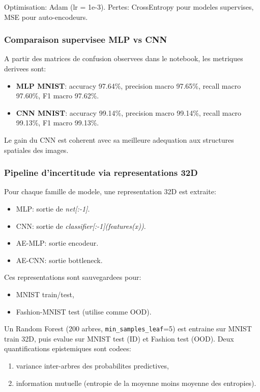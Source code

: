 \documentclass[11pt,a4paper]{article}
\begin{document}
Optimisation: Adam (lr = 1e-3). Pertes: CrossEntropy pour modeles supervises, MSE pour auto-encodeurs.

\subsubsection{Comparaison supervisee MLP vs CNN}
A partir des matrices de confusion observees dans le notebook, les metriques derivees sont:
\begin{itemize}[leftmargin=1.2cm]
    \item \textbf{MLP MNIST}: accuracy 97.64\%, precision macro 97.65\%, recall macro 97.60\%, F1 macro 97.62\%.
    \item \textbf{CNN MNIST}: accuracy 99.14\%, precision macro 99.14\%, recall macro 99.13\%, F1 macro 99.13\%.
\end{itemize}
Le gain du CNN est coherent avec sa meilleure adequation aux structures spatiales des images.

\subsubsection{Pipeline d'incertitude via representations 32D}
Pour chaque famille de modele, une representation 32D est extraite:
\begin{itemize}[leftmargin=1.2cm]
    \item MLP: sortie de \textit{net[:-1]}.
    \item CNN: sortie de \textit{classifier[:-1](features(x))}.
    \item AE-MLP: sortie encodeur.
    \item AE-CNN: sortie bottleneck.
\end{itemize}

Ces representations sont sauvegardees pour:
\begin{itemize}[leftmargin=1.2cm]
    \item MNIST train/test,
    \item Fashion-MNIST test (utilise comme OOD).
\end{itemize}

Un Random Forest (200 arbres, \texttt{min\_samples\_leaf}=5) est entraine sur MNIST train 32D, puis evalue sur MNIST test (ID) et Fashion test (OOD). Deux quantifications epistemiques sont codees:
\begin{enumerate}[leftmargin=1.2cm]
    \item variance inter-arbres des probabilites predictives,
    \item information mutuelle (entropie de la moyenne moins moyenne des entropies).
\end{enumerate}
\end{document}
